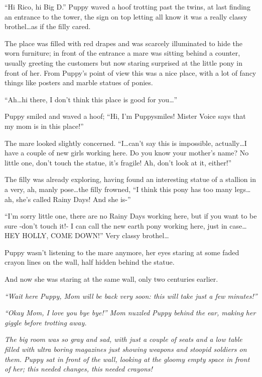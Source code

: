 ``Hi Rico, hi Big D.'' Puppy waved a hoof trotting past the twins, at last finding an entrance to the tower, the sign on top letting all know it was a really classy brothel\dots as if the filly cared.

The place was filled with red drapes and was scarcely illuminated to hide the worn furniture; in front of the entrance a mare was sitting behind a counter, usually greeting the customers but now staring surprised at the little pony in front of her. From Puppy's point of view this was a nice place, with a lot of fancy things like posters and marble statues of ponies.

``Ah\dots hi there, I don't think this place is good for you\dots''

Puppy smiled and waved a hoof; ``Hi, I'm Puppysmiles! Mister Voice says that my mom is in this place!''

The mare looked slightly concerned. ``I\dots can't say this is impossible, actually\dots I have a couple of new girls working here. Do you know your mother's name? No little one, don't touch the statue, it's fragile! Ah, don't look at it, either!''

The filly was already exploring, having found an interesting statue of a stallion in a very, ah, manly pose\dots the filly frowned, ``I think this pony has too many legs\dots ah, she's called Rainy Days! And she is-''

``I'm sorry little one, there are no Rainy Days working here, but if you want to be sure -don't touch it!- I can call the new earth pony working here, just in case\dots HEY HOLLY, COME DOWN!'' Very classy brothel\dots

Puppy wasn't listening to the mare anymore, her eyes staring at some faded crayon lines on the wall, half hidden behind the statue.

And now she was staring at the same wall, only two centuries earlier.

\emph{``Wait here Puppy, Mom will be back very soon: this will take just a few minutes!''}

\emph{``Okay Mom, I love you bye bye!'' Mom nuzzled Puppy behind the ear, making her giggle before trotting away.}

\emph{The big room was so gray and sad, with just a couple of seats and a low table filled with ultra boring magazines just showing weapons and stoopid soldiers on them. Puppy sat in front of the wall, looking at the gloomy empty space in front of her; this needed changes, this needed crayons!}

